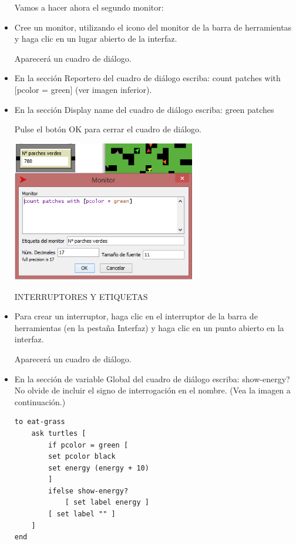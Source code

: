 \documentclass[12pt,letterpaper]{article}
\begin{document}
\begin{itemize}
Vamos a hacer ahora el segundo monitor:

\item Cree un monitor, utilizando el icono del monitor de la barra de herramientas y haga clic en un lugar abierto de la interfaz.

Aparecerá un cuadro de diálogo.

\item En la sección Reportero del cuadro de diálogo escriba: count patches with [pcolor = green]  (ver imagen inferior).
\item En la sección Display name del cuadro de diálogo escriba: green patches


Pulse el botón OK para cerrar el cuadro de diálogo.


\begin{center}
	\includegraphics[width=8cm]{./imagenes/image9.png}
\end{center}


\begin{center}
INTERRUPTORES Y ETIQUETAS
\end{center}

\item Para crear un interruptor, haga clic en el interruptor de la barra de herramientas (en la pestaña Interfaz) y haga clic en un punto abierto en la interfaz.

Aparecerá un cuadro de diálogo.

\item En la sección de variable Global del cuadro de diálogo escriba: show-energy? No olvide de incluir el signo de interrogación en el nombre. (Vea la imagen a continuación.)

\begin{lstlisting}
to eat-grass
    ask turtles [
 		if pcolor = green [
		set pcolor black
    	set energy (energy + 10)
    	] 
    	ifelse show-energy?
       		[ set label energy ]
 		[ set label "" ]
    ] 
end
\end{lstlisting}



\end{itemize}
\end{document}
